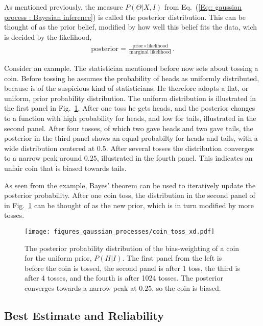 \documentclass[twoside,english]{uiofysmaster}
\begin{document}
{{As mentioned previously, the measure $P(\Theta | X , I)$ from Eq.~(\ref{Eq:: gaussian process : Bayesian inference}) is called the posterior distribution. This can be thought of as the prior belief, modified by how well this belief fits the data, wich is decided by the likelihood,
\begin{align*}
\text{posterior} = \frac{\text{prior} \times \text{likelihood}}{\text{marginal likelihood}}.
\end{align*}

Consider an example. The statistician mentioned before now sets about tossing a coin. Before tossing he assumes the probability of heads as uniformly distributed, because is of the suspicious kind of statisticians. He therefore adopts a flat, or uniform, prior probability distribution. The uniform distribution is illustrated in the first panel in Fig.~\ref{Fig:: gaussian process : Dice throw }. After one toss he gets heads, and the posterior changes to a function with high probability for heads, and low for tails, illustrated in the second panel. After four tosses, of which two gave heads and two gave tails, the posterior in the third panel shows an equal probabilty for heads and tails, with a wide distribution centered at 0.5. After several tosses the distribution converges to a narrow peak around $0.25$, illustrated in the fourth panel. This indicates an unfair coin that is biased towards tails.

As seen from the example, Bayes' theorem can be used to iteratively update the posterior probability. After one coin toss, the distribution in the second panel of in Fig.~\ref{Fig:: gaussian process : Dice throw } can be thought of as the new prior, which is in turn modified by more tosses.

\begin{figure}
\texttt{[image: figures\_gaussian\_processes/coin\_toss\_xd.pdf]}
\caption[Priors and posteriors of a coin toss experiment]{The posterior probability distribution of the bias-weighting of a coin for the uniform prior, $P(H|I)$. The first panel from the left is before the coin is tossed, the second panel is after 1 toss, the third is after 4 tosses, and the fourth is after 1024 tosses. The posterior converges towards a narrow peak at $0.25$, so the coin is biased.}
\label{Fig:: gaussian process : Dice throw }
\end{figure}


\subsection{Best Estimate and Reliability}\label{Sec:: gaussian process : Best estimate}

}}
\end{document}
